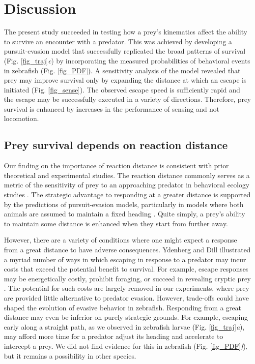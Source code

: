 \documentclass[]{rsos}%
\begin{document}
\pagebreak

\section{Discussion}%

The present study succeeded in testing how a prey's kinematics affect the ability to survive an encounter with a predator.
This was achieved by developing a pursuit-evasion model that successfully replicated the broad patterns of survival (Fig. \ref{fig_traj}\textit{c}) by incorporating the measured probabilities of behavioral events in zebrafish (Fig. \ref{fig_PDF}).
A sensitivity analysis of the model revealed that prey may improve survival only by expanding the distance at which an escape is initiated (Fig. \ref{fig_sense}). 
The observed escape speed is sufficiently rapid and the escape may be successfully executed in a variety of directions.
Therefore, prey survival is enhanced by increases in the performance of sensing and not locomotion.


\subsection{Prey survival depends on reaction distance} 

Our finding on the importance of reaction distance is consistent with prior theoretical and experimental studies.
The reaction distance commonly serves as a metric of the sensitivity of prey to an approaching predator in behavioral ecology studies \cite{Cooper:2015vf}.
The strategic advantage to responding at a greater distance is supported by the predictions of pursuit-evasion models, particularly in models where both animals are assumed to maintain a fixed heading \cite{Isaacs:1965uz,Weihs:1984tb,Soto:2015cj}. 
Quite simply, a prey's ability to maintain some distance is enhanced when they start from further away.

However, there are a variety of conditions where one might expect a response from a great distance to have adverse consequences.
Ydenberg and Dill \cite{Ydenberg:1986tm} illustrated a myriad number of ways in which escaping in response to a predator may incur costs that exceed the potential benefit to survival.
For example, escape responses may be energetically costly, prohibit foraging, or succeed in revealing cryptic prey \cite{Cooper:2015vf,Broom:2005gq}.
The potential for such costs are largely removed in our experiments, where prey are provided little alternative to predator evasion.
However, trade-offs could have shaped the evolution of evasive behavior in zebrafish.
Responding from a great distance may even be inferior on purely strategic grounds. 
For example, escaping early along a straight path, as we observed in zebrafish larvae (Fig. \ref{fig_traj}\textit{a}), may afford more time for a predator adjust its heading and accelerate to intercept a prey. 
We did not find evidence for this in zebrafish (Fig. \ref{fig_PDF}\textit{f}), but it remains a possibility in other species.
\end{document}
